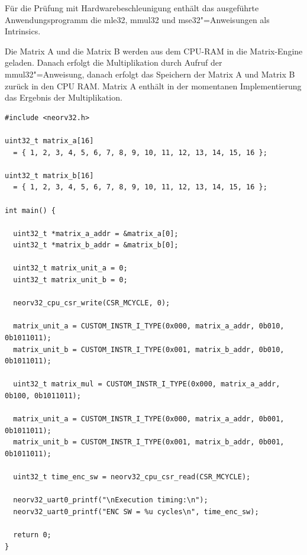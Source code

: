 Für die Prüfung mit Hardwarebeschleunigung enthält das ausgeführte Anwendungsprogramm die mle32, mmul32 und mse32"=Anweisungen als Intrinsics.

Die Matrix A und die Matrix B werden aus dem CPU-RAM in die Matrix-Engine geladen. Danach erfolgt die Multiplikation durch Aufruf der mmul32"=Anweisung, danach erfolgt das Speichern der Matrix A und Matrix B zurück in den CPU RAM. Matrix A enthält in der momentanen Implementierung das Ergebnis der Multiplikation.

\begin{lstlisting}[style=PseudoLang,caption={Verwendung der Intrinsics},captionpos=b]
#include <neorv32.h>

uint32_t matrix_a[16]
  = { 1, 2, 3, 4, 5, 6, 7, 8, 9, 10, 11, 12, 13, 14, 15, 16 };

uint32_t matrix_b[16]
  = { 1, 2, 3, 4, 5, 6, 7, 8, 9, 10, 11, 12, 13, 14, 15, 16 };

int main() {

  uint32_t *matrix_a_addr = &matrix_a[0];
  uint32_t *matrix_b_addr = &matrix_b[0];

  uint32_t matrix_unit_a = 0;
  uint32_t matrix_unit_b = 0;

  neorv32_cpu_csr_write(CSR_MCYCLE, 0);

  matrix_unit_a = CUSTOM_INSTR_I_TYPE(0x000, matrix_a_addr, 0b010, 0b1011011);
  matrix_unit_b = CUSTOM_INSTR_I_TYPE(0x001, matrix_b_addr, 0b010, 0b1011011);

  uint32_t matrix_mul = CUSTOM_INSTR_I_TYPE(0x000, matrix_a_addr, 0b100, 0b1011011);

  matrix_unit_a = CUSTOM_INSTR_I_TYPE(0x000, matrix_a_addr, 0b001, 0b1011011);
  matrix_unit_b = CUSTOM_INSTR_I_TYPE(0x001, matrix_b_addr, 0b001, 0b1011011);

  uint32_t time_enc_sw = neorv32_cpu_csr_read(CSR_MCYCLE);

  neorv32_uart0_printf("\nExecution timing:\n");
  neorv32_uart0_printf("ENC SW = %u cycles\n", time_enc_sw);

  return 0;
}
\end{lstlisting}





